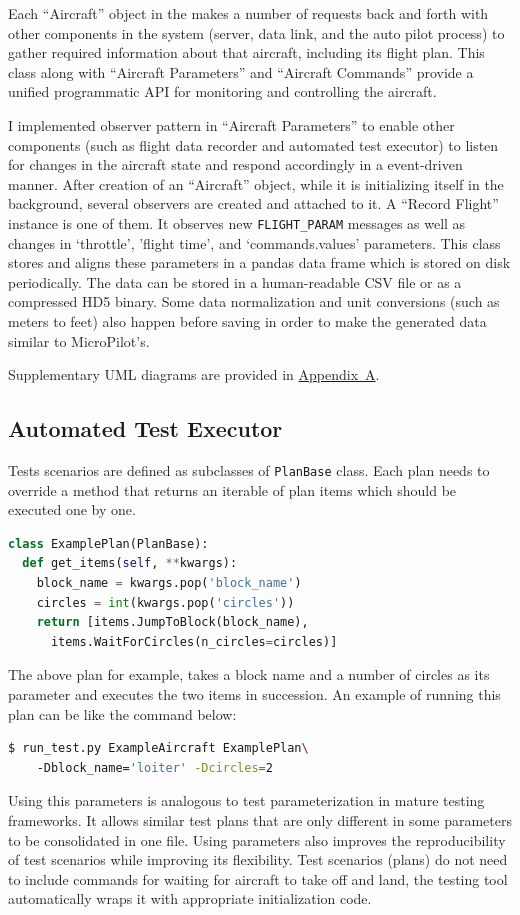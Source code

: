 Each ``Aircraft'' object in the makes a number of requests back and forth with other components in the system (server, data link, and the auto pilot process) to gather required information about that aircraft, including its flight plan. This class along with ``Aircraft Parameters'' and ``Aircraft Commands'' provide a unified programmatic API for monitoring and controlling the aircraft. 

I implemented observer pattern \cite{gamma1995design} in ``Aircraft Parameters'' to enable other components (such as flight data recorder and automated test executor) to listen for changes in the aircraft state and respond accordingly in a event-driven manner. 
After creation of an ``Aircraft'' object, while it is initializing itself in the background, several observers are created and attached to it. A ``Record Flight'' instance is one of them. It observes new \verb|FLIGHT_PARAM| messages as well as changes in `throttle', 'flight time', and `commands.values' parameters. This class stores and aligns these parameters in a pandas data frame which is stored on disk periodically. The data can be stored in a human-readable CSV file or as a compressed HD5 binary. Some data normalization and unit conversions (such as meters to feet) also happen before saving in order to make the generated data similar to MicroPilot's.

Supplementary UML diagrams are provided in \hyperref[appendixa]{Appendix~A}.


\subsection{Automated Test Executor}
Tests scenarios are defined as subclasses of \verb|PlanBase| class. Each plan needs to override a method that returns an iterable of plan items which should be executed one by one. 
\begin{lstlisting}[language=Python, basicstyle=\linespread{0.1}]
class ExamplePlan(PlanBase):
  def get_items(self, **kwargs):
    block_name = kwargs.pop('block_name')
    circles = int(kwargs.pop('circles'))
    return [items.JumpToBlock(block_name),
      items.WaitForCircles(n_circles=circles)]
\end{lstlisting}
The above plan for example, takes a block name and a number of circles as its parameter and executes the two items in succession. An example of running this plan can be like the command below:
\begin{lstlisting}[language=bash]
$ run_test.py ExampleAircraft ExamplePlan\ 
    -Dblock_name='loiter' -Dcircles=2
\end{lstlisting}
Using this parameters is analogous to test parameterization in mature testing frameworks. It allows similar test plans that are only different in some parameters to be consolidated in one file. Using parameters also improves the reproducibility of test scenarios while improving its flexibility. Test scenarios (plans) do not need to include commands for waiting for aircraft to take off and land, the testing tool automatically wraps it with appropriate initialization code.


